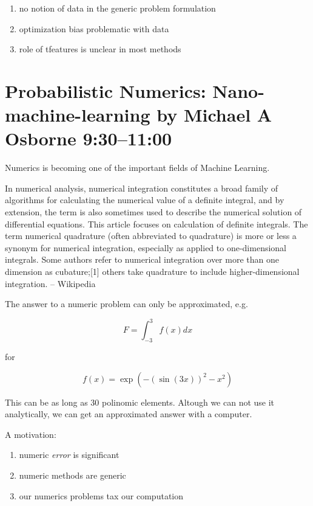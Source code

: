 \documentclass[b5paper]{report}
\begin{document}
\begin{enumerate}
  \item no notion of data in the generic problem formulation
  \item optimization bias problematic with data
  \item role of tfeatures is unclear in most methods
\end{enumerate}

\chapter{Probabilistic Numerics: Nano-machine-learning by Michael A Osborne
9:30--11:00}

Numerics is becoming one of the important fields of Machine Learning.

\begin{mybox}
  In numerical analysis, numerical integration constitutes a broad family of
  algorithms for calculating the numerical value of a definite integral, and by
  extension, the term is also sometimes used to describe the numerical solution
  of differential equations. This article focuses on calculation of definite
  integrals. The term numerical quadrature (often abbreviated to quadrature) is
  more or less a synonym for numerical integration, especially as applied to
  one-dimensional integrals. Some authors refer to numerical integration over
  more than one dimension as cubature;[1] others take quadrature to include
  higher-dimensional integration. -- Wikipedia
\end{mybox}

The answer to a numeric problem can only be approximated, e.g.

\begin{equation}
  F = \int_{-3}^3 f(x) dx
\end{equation}

for

\begin{equation}
  f(x) = \exp(-(\sin(3x))^2 - x^2)
\end{equation}

This can be as long as 30 polinomic elements. Altough we can not use it
analytically, we can get an approximated answer with a computer.

A motivation:

\begin{enumerate}
  \item numeric \emph{error} is significant
  \item numeric methods are generic
  \item our numerics problems tax our computation
\end{enumerate}
\end{document}
